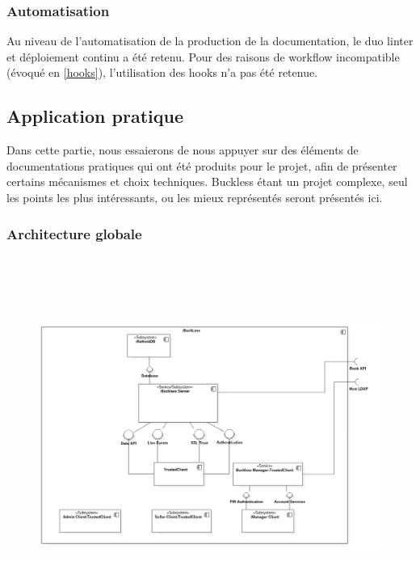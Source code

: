     \subsubsection{Automatisation}
        Au niveau de l'automatisation de la production de la documentation, le duo linter et
        déploiement continu a été retenu. Pour des raisons de workflow incompatible (évoqué en
        \ref{hooks}), l'utilisation des hooks n'a pas été retenue.

\newpage
\subsection{Application pratique}
    Dans cette partie, nous essaierons de nous appuyer sur des éléments de documentations pratiques
    qui ont été produits pour le projet, afin de présenter certains mécanismes et choix techniques.
    Buckless étant un projet complexe, seul  les points les plus intéressants, ou les mieux représentés
    seront présentés ici.

    \subsubsection{Architecture globale}
        \begin{figure}[h]
            \centering
            \includegraphics[height=12cm]{./assets/UML/system.png}
        \end{figure}

